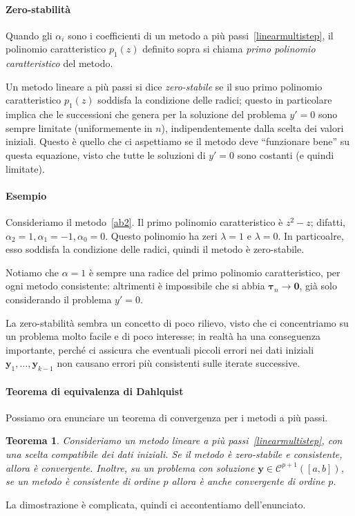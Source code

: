 \documentclass[a4paper]{report}
\newtheorem{theorem}{Teorema}[chapter]
\theoremstyle{definiton}
\theoremstyle{remark}
\newcommand{\y}{\mathbf{y}}
\begin{document}
\paragraph{Zero-stabilità}
Quando gli $\alpha_i$ sono i coefficienti di un metodo a più passi~\eqref{linearmultistep}, il polinomio caratteristico $p_1(z)$ definito sopra si chiama \emph{primo polinomio caratteristico} del metodo.

Un metodo lineare a più passi si dice \emph{zero-stabile} se il suo primo polinomio caratteristico $p_1(z)$ soddisfa la condizione delle radici; questo in particolare implica che le successioni che genera per la soluzione del problema $y'=0$ sono sempre limitate (uniformemente in $n$), indipendentemente dalla scelta dei valori iniziali. Questo è quello che ci aspettiamo se il metodo deve ``funzionare bene'' su questa equazione, visto che tutte le soluzioni di $y'=0$ sono costanti (e quindi limitate).

\paragraph{Esempio} Consideriamo il metodo~\eqref{ab2}. Il primo polinomio caratteristico è $z^2-z$; difatti, $\alpha_2=1, \alpha_1=-1, \alpha_0 = 0$. Questo polinomio ha zeri $\lambda=1$ e $\lambda=0$. In particoalre, esso soddisfa la condizione delle radici, quindi il metodo è zero-stabile.

Notiamo che $\alpha = 1$ è sempre una radice del primo polinomio caratteristico, per ogni metodo consistente: altrimenti è impossibile che si abbia $\boldsymbol{\tau}_n \to \mathbf{0}$, già solo considerando il problema $y'=0$.

La zero-stabilità sembra un concetto di poco rilievo, visto che ci concentriamo su un problema molto facile e di poco interesse; in realtà ha una conseguenza importante, perché ci assicura che eventuali piccoli errori nei dati iniziali $\y_1,\dots,\y_{k-1}$ non causano errori più consistenti sulle iterate successive.

\paragraph{Teorema di equivalenza di Dahlquist}
Possiamo ora enunciare un teorema di convergenza per i metodi a più passi.
\begin{theorem}
Consideriamo un metodo lineare a più passi~\eqref{linearmultistep}, con una scelta compatibile dei dati iniziali. Se il metodo è zero-stabile e consistente, allora è convergente. Inoltre, su un problema con soluzione $\y \in \mathcal{C}^{p+1}([a,b])$, se un metodo è consistente di ordine $p$ allora è anche convergente di ordine $p$.
\end{theorem}
La dimostrazione è complicata, quindi ci accontentiamo dell'enunciato.
\end{document}
